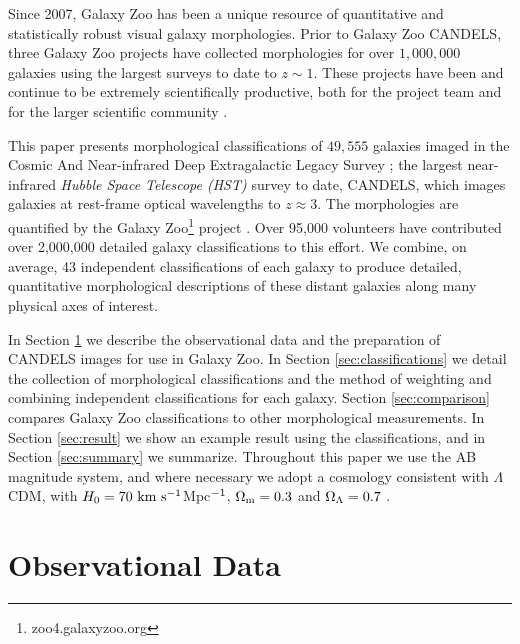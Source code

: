 \documentclass[useAMS,usenatbib]{mn2e}
\begin{document}
Since 2007, Galaxy Zoo has been a unique resource of quantitative and statistically robust visual galaxy morphologies. Prior to Galaxy Zoo CANDELS, three Galaxy Zoo projects have collected morphologies for over $1,000,000$ galaxies using the largest surveys to date to $z \sim 1$. These projects have been and continue to be extremely scientifically productive, both for the project team \citep[e.g.,][]{keel15,galloway15,willett15} and for the larger scientific community \citep[e.g.][]{amorin10,finkelman12,robaina12,combes13,joachimi15,lopezcorredoira15,zhang15}.

This paper presents morphological classifications of $49,555$ galaxies imaged in the Cosmic And Near-infrared Deep Extragalactic Legacy Survey \citep[CANDELS;][]{grogin11,koekemoer11}; the largest near-infrared \emph{Hubble Space Telescope (HST)} survey to date, CANDELS, which images galaxies at rest-frame optical wavelengths to $z \approx 3$. The morphologies are quantified by the Galaxy Zoo{\footnote{zoo4.galaxyzoo.org}} project \citep{lintott08}. Over 95,000 volunteers have contributed over 2,000,000 detailed galaxy classifications to this effort. We combine, on average, 43 independent classifications of each galaxy to produce detailed, quantitative morphological descriptions of these distant galaxies along many physical axes of interest. 

In Section \ref{sec:data} we describe the observational data and the preparation of CANDELS images for use in Galaxy Zoo. In Section \ref{sec:classifications} we detail the collection of morphological classifications and the method of weighting and combining independent classifications for each galaxy. Section \ref{sec:comparison} compares Galaxy Zoo classifications to other morphological measurements. In Section \ref{sec:result} we show an example result using the classifications, and in Section \ref{sec:summary} we summarize. Throughout
this paper we use the AB magnitude system, and where necessary we adopt a cosmology consistent with $\Lambda$CDM, with $H_{\rm 0}=70~{\rm
km~s^{-1}}$Mpc$^{\rm -1}$, $\Omega_{\rm m}=0.3$ and $\Omega_{\rm \Lambda}=0.7$ \citep{bennett13}.




%
%
\section{Observational Data}\label{sec:data}
%
%
\end{document}
